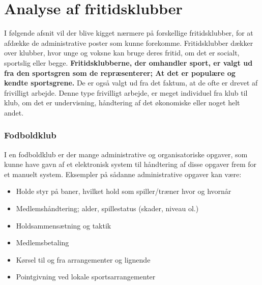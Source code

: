 \chapter{Analyse af fritidsklubber} \label{Fritidsklubber} 

I følgende afsnit vil der blive kigget nærmere på forskellige fritidsklubber, for at afdække de administrative poster som kunne
forekomme. Fritidsklubber dækker over klubber, hvor unge og voksne kan bruge deres fritid, om det er
socialt, sportslig eller begge. 
\textbf{Fritidsklubberne, der omhandler sport, er valgt ud fra den sportsgren som de
repræsenterer; At det er populære og kendte sportsgrene.}
De er også valgt ud fra det faktum, at de ofte er drevet af
frivilligt arbejde. Denne type frivilligt arbejde, er meget individuel fra klub til klub, om det er undervisning,
håndtering af det økonomiske eller noget helt andet. 

\subsection{Fodboldklub} \label{Fodbold}
I en fodboldklub er der mange administrative og organisatoriske opgaver, som kunne have gavn af et elektronisk system
til håndtering af disse opgaver frem for et manuelt system. Eksempler på sådanne
administrative opgaver kan være:

\begin{itemize}
\item Holde styr på baner, hvilket hold som spiller/træner hvor og hvornår
\item Medlemshåndtering; alder, spillestatus (skader, niveau ol.) 
\item Holdsammensætning og taktik 
\item Medlemsbetaling 
\item Kørsel til og fra arrangementer og lignende
\item Pointgivning ved lokale sportsarrangementer
\end{itemize}

